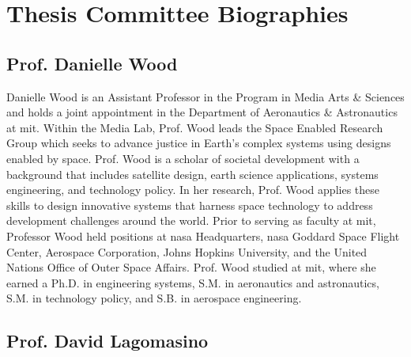 \documentclass[notitlepage]{article}
\begin{document}
\newpage

\section*{Thesis Committee Biographies}

\subsection*{Prof. Danielle Wood}

Danielle Wood is an Assistant Professor in the Program in Media Arts \& Sciences and holds a joint appointment in the Department of Aeronautics \& Astronautics at \ac{mit}. Within the Media Lab, Prof. Wood leads the Space Enabled Research Group which seeks to advance justice in Earth's complex systems using designs enabled by space. Prof. Wood is a scholar of societal development with a background that includes satellite design, earth science applications, systems engineering, and technology policy. In her research, Prof. Wood applies these skills to design innovative systems that harness space technology to address development challenges around the world. Prior to serving as faculty at \ac{mit}, Professor Wood held positions at \ac{nasa} Headquarters, \ac{nasa} Goddard Space Flight Center, Aerospace Corporation, Johns Hopkins University, and the United Nations Office of Outer Space Affairs. Prof. Wood studied at \ac{mit}, where she earned a Ph.D. in engineering systems, S.M. in aeronautics and astronautics, S.M. in technology policy, and S.B. in aerospace engineering.

\subsection*{Prof. David Lagomasino}
\end{document}
